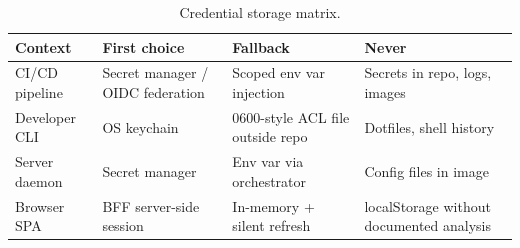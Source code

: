 \begin{table}[ht]
\centering\small
\begin{tabularx}{\textwidth}{l l l X}
\toprule
\textbf{Context} & \textbf{First choice} & \textbf{Fallback} & \textbf{Never} \\
\midrule
CI/CD pipeline & Secret manager / OIDC federation & Scoped env var injection & Secrets in repo, logs, images \\
Developer CLI & OS keychain & 0600-style ACL file outside repo & Dotfiles, shell history \\
Server daemon & Secret manager & Env var via orchestrator & Config files in image \\
Browser SPA & BFF server-side session & In-memory + silent refresh & localStorage without documented analysis \\
\bottomrule
\end{tabularx}
\caption{Credential storage matrix.}
\label{tab:ch5-storagematrix}
\end{table}



